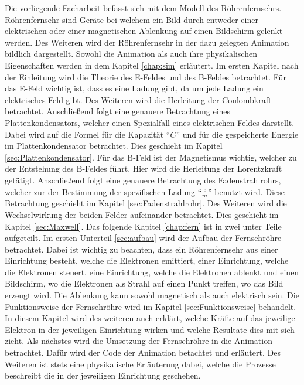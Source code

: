 Die vorliegende Facharbeit befasst sich mit dem Modell des Röhrenfernsehrs.
Röhrenfernsehr sind Geräte bei welchem ein Bild durch entweder einer elektrischen oder einer magnetischen Ablenkung auf einen Bildschirm gelenkt werden.
Des Weiteren wird der Röhrenfernsehr in der dazu gelegten Animation bildlich dargestellt.
Sowohl die Animation als auch ihre physikalischen Eigenschaften werden in dem Kapitel \ref{chap:sim} erläutert.
Im ersten Kapitel nach der Einleitung wird die Theorie des E-Feldes und des B-Feldes betrachtet.
Für das E-Feld wichtig ist, dass es eine Ladung gibt, da um jede Ladung ein elektrisches Feld gibt.
Des Weiteren wird die Herleitung der Coulombkraft betrachtet.
Anschließend folgt eine genauere Betrachtung eines Plattenkondensators, welcher einen Spezialfall eines elektrischen Feldes darstellt.
Dabei wird auf die Formel für die Kapazität "`$C$"' und für die gespeicherte Energie im Plattenkondensator betrachtet.
Dies geschieht im Kapitel \ref{sec:Plattenkondensator}.
Für das B-Feld ist der Magnetismus wichtig, welcher zu der Entstehung des B-Feldes führt.
Hier wird die Herleitung der Lorentzkraft getätigt.
Anschließend folgt eine genauere Betrachtung des Fadenstrahlrohrs, welcher zur der Bestimmung der spezifischen Ladung "`$\frac{e}{m}$"' benutzt wird.
Diese Betrachtung geschieht im Kapitel \ref{sec:Fadenstrahlrohr}.
Des Weiteren wird die Wechselwirkung der beiden Felder aufeinander betrachtet.
Dies geschieht im Kapitel \ref{sec:Maxwell}.
Das folgende Kapitel \ref{chap:fern} ist in zwei unter Teile aufgeteilt.
Im ersten Unterteil \ref{sec:aufbau} wird der Aufbau der Fernsehröhre betrachtet.
Dabei ist wichtig zu beachten, dass ein Röhrenfernsehr aus einer Einrichtung besteht, welche die Elektronen emittiert, einer Einrichtung, welche die Elektronen steuert, eine Einrichtung, welche die Elektronen ablenkt und einen Bildschirm, wo die Elektronen als Strahl auf einen Punkt treffen, wo das Bild erzeugt wird.
Die Ablenkung kann sowohl magnetisch als auch elektrisch sein.
Die Funktionsweise der Fernsehröhre wird im Kapitel \ref{sec:Funktionsweise} behandelt.
In diesem Kapitel wird des weiteren auch erklärt, welche Kräfte auf das jeweilige Elektron in der jeweiligen Einrichtung wirken und welche Resultate dies mit sich zieht.
Als nächstes wird die Umsetzung der Fernsehröhre in die Animation betrachtet.
Dafür wird der Code der Animation betachtet und erläutert.
Des Weiteren ist stets eine physikalische Erläuterung dabei, welche die Prozesse beschreibt die in der jeweiligen Einrichtung geschehen.
